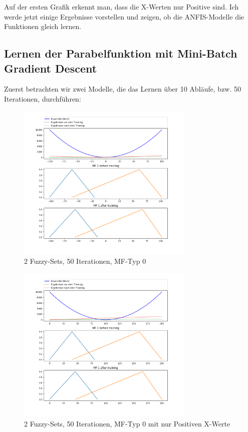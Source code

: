 Auf der ersten Grafik erkennt man, dass die X-Werten nur Positive sind. Ich werde jetzt einige Ergebnisse vorstellen und zeigen, ob die ANFIS-Modelle die Funktionen gleich lernen.

\subsection{Lernen der Parabelfunktion mit Mini-Batch Gradient Descent}

Zuerst betrachten wir zwei Modelle, die das Lernen über 10 Abläufe, bzw. 50 Iterationen, durchführen:
\begin{figure}[htbp]
	\centering
	\includegraphics[width=0.75\textwidth]{images/parabola_1000/Mini-Batch/parabola_1000 1 Input 2 Sets 50 Epochs Mini-Batch Gradient Descent two equations mf.png}
	\caption{2 Fuzzy-Sets, 50 Iterationen, MF-Typ 0}
\end{figure}
\begin{figure}[htbp]
	\centering
	\includegraphics[width=0.75\textwidth]{images/parabola_positive/Mini-Batch/parabola_positive 1 Input 2 Sets 50 Epochs Mini-Batch Gradient Descent two equations mf.png}
	\caption{2 Fuzzy-Sets, 50 Iterationen, MF-Typ 0 mit nur Positiven X-Werte}
\end{figure}

